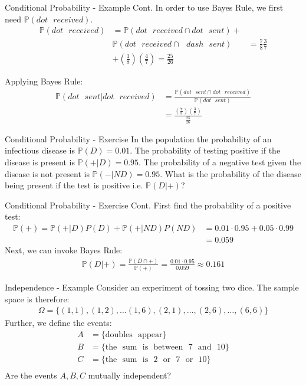 \documentclass{beamer}
\begin{document}
\begin{frame}{Conditional Probability - Example Cont.}
In order to use Bayes Rule, we first need $\mathbb{P}(dot \>\>\> received)$.
\begin{align*}
\mathbb{P}(dot \>\>\> received) &= \mathbb{P}(dot \>\>\> received \cap dot \>\>\> sent) + \\ 
&\mathbb{P}(dot \>\>\> received \cap \>\>\> dash \>\>\> sent) &= \frac{7}{8}\frac{3}{7} \\
&+ \left(\frac{1}{8}\right)\left(\frac{4}{7}\right) = \frac{25}{26}
\end{align*}

Applying Bayes Rule:
\begin{align*}
\mathbb{P}(dot\>\>\> sent| dot \>\>\> received)  &= \frac{\mathbb{P}(dot \>\>\> sent \cap dot \>\>\> received)}{\mathbb{P}(dot \>\>\> sent)} \\
&= \frac{\left(\frac{7}{8}\right)\left(\frac{3}{7}\right)}{\frac{25}{26}}
\end{align*}
\end{frame}

\begin{frame}{Conditional Probability - Exercise}
In the population the probability of an infectious disease is $\mathbb{P}(D) = 0.01$. The probability of testing positive if the disease is present is $\mathbb{P}(+|D) = 0.95$. The probability of a negative test given the disease is not present is $\mathbb{P}(-|ND) = 0.95$. What is the probability of the disease being present if the test is positive i.e. $\mathbb{P}(D|+)?$
\end{frame}

\begin{frame}{Conditional Probability - Exercise Cont.}
First find the probability of a positive test:
\begin{align*}
\mathbb{P}(+) = \mathbb{P}(+|D)P(D) + \mathbb{P}(+|ND)P(ND) &= 0.01 \cdot 0.95 + 0.05 \cdot 0.99\\
 &= 0.059
\end{align*}
Next, we can invoke Bayes Rule:
\begin{align*}
\mathbb{P}(D|+) = \frac{\mathbb{P}(D \cap +)}{\mathbb{P}(+)} = \frac{0.01\cdot 0.95}{0.059} \approx 0.161
\end{align*}
\end{frame}

\begin{frame}{Independence - Example}
Consider an experiment of tossing two dice. The sample space is therefore:
\begin{align*}
\Omega = \{(1,1), (1,2),  \ldots (1,6), (2,1), \ldots, (2, 6), \ldots, (6,6)
\}
\end{align*}
Further, we define the events:
\begin{align*}
A &= \{\mathrm{doubles \>\>\> appear}\} \\
B &= \{\mathrm{the \>\>\> sum \>\>\> is \>\>\> between \>\>\> 7 \>\>\> and \>\>\> 10}\} \\
C &= \{\mathrm{the \>\>\> sum \>\>\> is \>\>\> 2 \>\>\> or \>\>\> 7 \>\>\> or \>\>\> 10}\} \\
\end{align*}
Are the events $A, B, C$ mutually independent?
\end{frame}
\end{document}

